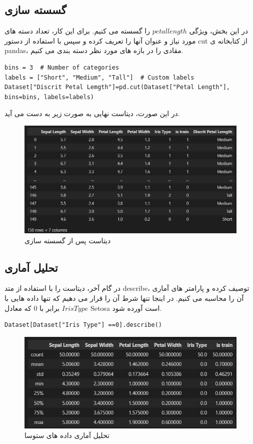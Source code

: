\subsection{گسسته سازی}
در این بخش، ویژگی $petal length$ را گسسته می کنیم. برای این کار، تعداد دسته های مورد نیاز و عنوان آنها را تعریف کرده و سپس با استفاده از دستور cut از کتابخانه ی pandas، مقادی را در بازه های مورد نظر دسته بندی می کنیم.
\begin{verbatim}
bins = 3  # Number of categories
labels = ["Short", "Medium", "Tall"]  # Custom labels
Dataset["Discrit Petal Lemgth"]=pd.cut(Dataset["Petal Length"], bins=bins, labels=labels)
\end{verbatim}
در این صورت، دیتاست نهایی به صورت زیر به دست می آید.
\begin{figure}[H]
	\centering
	\includegraphics[width=0.7\linewidth]{../img/14}
	\caption{دیتاست پس از گسسته سازی}
	\label{fig:14}
\end{figure}
\subsection{تحلیل آماری}
در گام آخر، دیتاست را با استفاده از متد describe، توصیف کرده و پارامتر های آماری آن را محاسبه می کنیم. در اینجا تنها شرط آن را قرار می دهیم که تنها داده هایی با $Iris Type$ برابر با 0 که معادل Setosa است آورده شود.
\begin{verbatim}
Dataset[Dataset["Iris Type"] ==0].describe()
\end{verbatim}
\begin{figure}[H]
	\centering
	\includegraphics[width=0.7\linewidth]{../img/15}
	\caption{تحلیل آماری داده های ستوسا}
	\label{fig:15}
\end{figure}







	



 
 
 
 